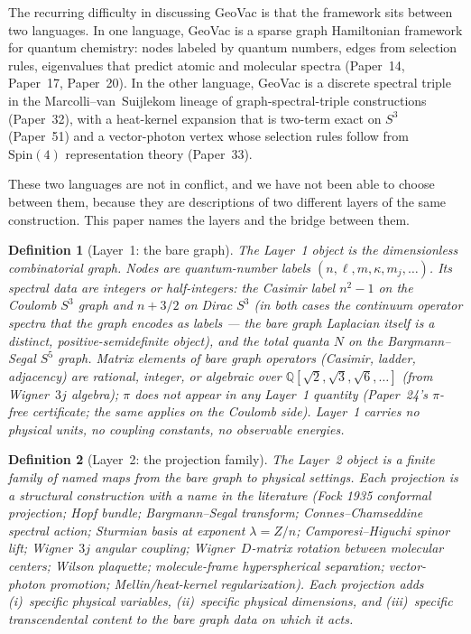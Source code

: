 \documentclass[11pt]{article}
\newtheorem{definition}{Definition}
\begin{document}
The recurring difficulty in discussing GeoVac is that the framework
sits between two languages.  In one language, GeoVac is a sparse
graph Hamiltonian framework for quantum chemistry: nodes labeled by
quantum numbers, edges from selection rules, eigenvalues that
predict atomic and molecular spectra (Paper~14, Paper~17, Paper~20).
In the other language, GeoVac is a discrete spectral triple in the
Marcolli--van~Suijlekom lineage of graph-spectral-triple
constructions (Paper~32), with a heat-kernel expansion that is
two-term exact on $S^3$ (Paper~51) and a vector-photon vertex whose
selection rules follow from $\mathrm{Spin}(4)$ representation theory
(Paper~33).

These two languages are not in conflict, and we have not been able
to choose between them, because they are descriptions of two
different layers of the same construction.  This paper names the
layers and the bridge between them.

\begin{definition}[Layer~1: the bare graph]
\label{def:layer1}
The Layer~1 object is the dimensionless combinatorial graph.  Nodes
are quantum-number labels $(n, \ell, m, \kappa, m_j, \ldots)$.
Its spectral data are integers or half-integers: the Casimir label
$n^2 - 1$ on the Coulomb $S^3$ graph and $n + 3/2$ on Dirac $S^3$
(in both cases the \emph{continuum} operator spectra that the graph
encodes as labels --- the bare graph Laplacian itself is a distinct,
positive-semidefinite object), and the total quanta $N$ on the
Bargmann--Segal $S^5$ graph.  Matrix elements of bare graph
operators (Casimir, ladder, adjacency) are rational, integer, or
algebraic over $\mathbb{Q}[\sqrt{2}, \sqrt{3}, \sqrt{6},\ldots]$
(from Wigner~$3j$ algebra); $\pi$ does not appear in any Layer~1
quantity (Paper~24's $\pi$-free certificate; the same applies on
the Coulomb side).  Layer~1 carries no physical units, no
coupling constants, no observable energies.
\end{definition}

\begin{definition}[Layer~2: the projection family]
\label{def:layer2}
The Layer~2 object is a finite family of named maps from the bare
graph to physical settings.  Each projection is a structural
construction with a name in the literature (Fock 1935 conformal
projection; Hopf bundle; Bargmann--Segal transform; Connes--Chamseddine
spectral action; Sturmian basis at exponent $\lambda = Z/n$;
Camporesi--Higuchi spinor lift; Wigner~$3j$ angular coupling;
Wigner~$D$-matrix rotation between molecular centers; Wilson
plaquette; molecule-frame hyperspherical separation; vector-photon
promotion; Mellin/heat-kernel regularization).  Each projection
adds (i)~specific physical variables, (ii)~specific physical
dimensions, and (iii)~specific transcendental content to the bare
graph data on which it acts.
\end{definition}
\end{document}
